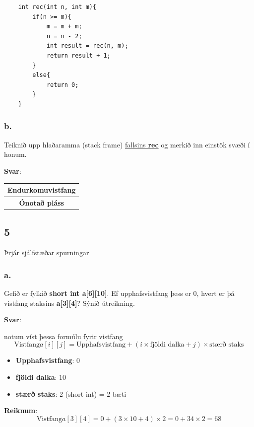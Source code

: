 \documentclass{article}
\begin{document}
\begin{lstlisting}
    int rec(int n, int m){
        if(n >= m){
            m = m + m;
            n = n - 2;
            int result = rec(n, m);
            return result + 1;
        }
        else{
            return 0;
        }
    }
\end{lstlisting}

\subsubsection{b.}Teiknið upp hlaðaramma (stack frame) \underline{fallsins \textbf{rec}} og merkið inn einstök
svæði í honum.

\textbf{Svar}:


\begin{center}
    \begin{tabular}{|c|}
        \hline
        \textbf{Endurkomuvistfang}\\ \hline
        \textbf{Ónotað pláss}\\ \hline
    \end{tabular}
\end{center}


\newpage

\subsection{5} Þrjár sjálfstæðar spurningar

\subsubsection{a.} Gefið er fylkið \textbf{short int a[6][10]}. Ef upphafsvistfang þess er 0, hvert
er þá vistfang staksins \textbf{a[3][4]}? Sýnið útreikning.

\textbf{Svar}:

notum víst þessa formúlu fyrir vistfang
\[ \text{Vistfang} a[i][j] = \text{Upphafsvistfang} + ( i \times \text{fjöldi dalka} + j) \times \text{stærð staks}\]
\begin{itemize}
    \item \textbf{Upphafsvistfang}: 0
    \item \textbf{fjöldi dalka}: 10
    \item \textbf{stærð staks}: 2 (short int) = 2 bæti
\end{itemize}

\textbf{Reiknum}:
\[ \text{Vistfang} a[3][4] = 0 + (3 \times 10 + 4) \times 2 = 0 + 34 \times 2 = 68\]
\end{document}
